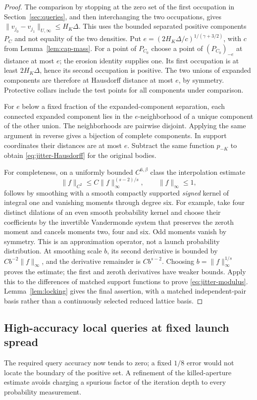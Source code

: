 \begin{proof}
The comparison by stopping at the zero set of the first occupation in
Section~\ref{sec:queries}, and then interchanging the two occupations,
gives
$\|v_{j_0}-v_{j_1}\|_{U,\infty}\le H_K\Delta$.
This uses the bounded separated positive components $P_C$ and not
equality of the two densities. Put
$e=(2H_K\Delta/c)^{1/(\gamma+3/2)}$, with $c$ from
Lemma~\ref{lem:cap-mass}. For a point of $P_{C_0}$ choose a point of
$(P_{C_0})_{-e}$ at distance at most $e$; the erosion identity supplies
one. Its first occupation is at least $2H_K\Delta$, hence its second
occupation is positive. The two unions of expanded components are
therefore at Hausdorff distance at most $e$, by symmetry. Protective
collars include the test points for all components under comparison.

For $e$ below a fixed fraction of the expanded-component separation,
each connected expanded component lies in the $e$-neighborhood of a
unique component of the other union. The neighborhoods are pairwise
disjoint. Applying the same argument in reverse gives a bijection of
complete components. In support coordinates their distances are at
most $e$. Subtract the same function $p_{-K}$ to obtain
\eqref{eq:jitter-Hausdorff} for the original bodies.

For completeness, on a uniformly bounded $C^{6,\beta}$ class the
interpolation estimate
\[
 \|f\|_{C^2}\le C\|f\|_\infty^{(s-2)/s},\qquad
                              \|f\|_\infty\le1,
\]
follows by smoothing with a smooth compactly supported \emph{signed}
kernel of integral one and vanishing moments through degree six.
For example, take four distinct dilations of an even smooth probability
kernel and choose their coefficients by the invertible Vandermonde
system that preserves the zeroth moment and cancels moments two, four
and six. Odd moments vanish by symmetry. This is an approximation
operator, not a launch probability distribution. At smoothing scale $b$, its second
derivative is bounded by $C b^{-2}\|f\|_\infty$, and the derivative
remainder is $C b^{s-2}$. Choosing $b=\|f\|_\infty^{1/s}$ proves
the estimate; the first and zeroth derivatives have weaker bounds.
Apply this to the differences of matched support functions to prove
\eqref{eq:jitter-modulus}. Lemma~\ref{lem:locking} gives the final
assertion, with a matched independent-pair basis rather than a
continuously selected reduced lattice basis.
\end{proof}

\subsection{High-accuracy local queries at fixed launch spread}
The required query accuracy now tends to zero; a fixed $1/8$ error
would not locate the boundary of the positive set. A refinement of the
killed-aperture estimate avoids charging a spurious factor of the
iteration depth to every probability measurement.

